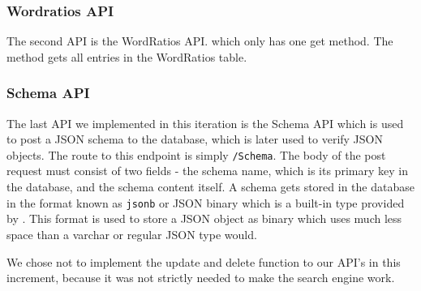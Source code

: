 \subsubsection{Wordratios API}
The second API is the WordRatios API. which only has one get method.
The method gets all entries in the WordRatios table. 

\subsubsection{Schema API}

The last API we implemented in this iteration is the Schema API which is used to post a JSON schema to the database, which is later used to verify JSON objects.
The route to this endpoint is simply \texttt{/Schema}. 
The body of the post request must consist of two fields - the schema name, which is its primary key in the database, and the schema content itself. 
A schema gets stored in the database in the format known as \texttt{jsonb} or JSON binary which is a built-in type provided by \postgres{}.
This format is used to store a JSON object as binary which uses much less space than a varchar or regular JSON type would.




We chose not to implement the update and delete function to our API's in this increment, 
because it was not strictly needed to make the search engine work.





    
